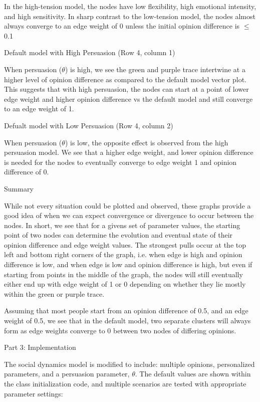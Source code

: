 \documentclass[11pt]{article}
\begin{document}
In the high-tension model, the nodes have low flexibility, high
emotional intensity, and high sensitivity. In sharp contrast to the
low-tension model, the nodes almost always converge to an edge weight of
0 unless the initial opinion difference is \(\leq\) 0.1

Default model with High Persuasion (Row 4, column 1)

When persuasion (\(\theta\)) is high, we see the green and purple trace
intertwine at a higher level of opinion difference as compared to the
default model vector plot. This suggests that with high persuasion, the
nodes can start at a point of lower edge weight and higher opinion
difference vs the default model and still converge to an edge weight of
1.

Defualt model with Low Persuasion (Row 4, column 2)

When persuasion (\(\theta\)) is low, the opposite effect is observed
from the high persuasion model. We see that a higher edge weight, and
lower opinion difference is needed for the nodes to eventually converge
to edge weight 1 and opinion difference of 0.

Summary

While not every situation could be plotted and observed, these graphs
provide a good idea of when we can expect convergence or divergence to
occur between the nodes. In short, we see that for a givens set of
parameter values, the starting point of two nodes can determine the
evolution and eventual state of their opinion difference and edge weight
values. The strongest pulls occur at the top left and bottom right
corners of the graph, i.e. when edge is high and opinion difference is
low, and when edge is low and opinion difference is high, but even if
starting from points in the middle of the graph, the nodes will still
eventually either end up with edge weight of 1 or 0 depending on whether
they lie mostly within the green or purple trace.

Assuming that most people start from an opinion difference of 0.5, and
an edge weight of 0.5, we see that in the default model, two separate
clusters will always form as edge weights converge to 0 between two
nodes of differing opinions.

    Part 3: Implementation

The social dynamics model is modified to include: multiple opinions,
personalized parameters, and a persuasion parameter, \(\theta\). The
default values are shown within the class initialization code, and
multiple scenarios are tested with appropriate parameter settings:
\end{document}

